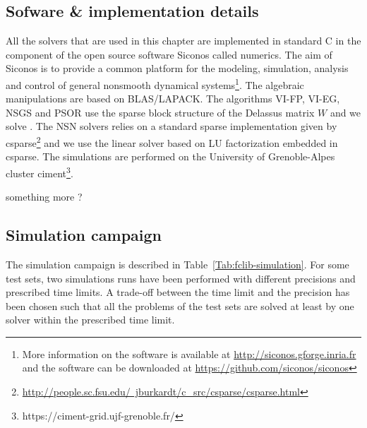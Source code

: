 

\subsection{Sofware \& implementation details}

All the solvers that are used in this chapter are implemented in standard C in the component of the open source software Siconos called numerics. The aim of Siconos is to provide a common platform for the modeling, simulation, analysis and control of general nonsmooth dynamical systems\footnote{More information on the software is available at \href{http://siconos.gforge.inria.fr}{http://siconos.gforge.inria.fr} and the software can be downloaded at  \href{https://github.com/siconos/siconos}{https://github.com/siconos/siconos}}. The algebraic manipulations are based on BLAS/LAPACK. The algorithms {\sf VI-FP}, {\sf VI-EG}, {\sf NSGS} and {\sf PSOR} use the sparse block structure of the Delassus matrix $W$ and we solve . The {\sf NSN} solvers relies on a standard sparse implementation given by csparse\footnote{\href{http://people.sc.fsu.edu/~jburkardt/c_src/csparse/csparse.html}{http://people.sc.fsu.edu/~jburkardt/c\_src/csparse/csparse.html}} and we use the linear solver based on LU factorization embedded in csparse. The simulations are performed on the University of Grenoble-Alpes cluster {\sc ciment}\footnote{https://ciment-grid.ujf-grenoble.fr/}.





\begin{ndrva}
 something more ?
\end{ndrva}

\subsection{Simulation campaign}
The simulation campaign is described in Table~\ref{Tab:fclib-simulation}. For some test sets, two simulations runs have been performed with different precisions and prescribed time limits. A trade-off between the time limit and the precision has been chosen such that all the problems of the test sets are solved at least by one solver within the prescribed time limit.


